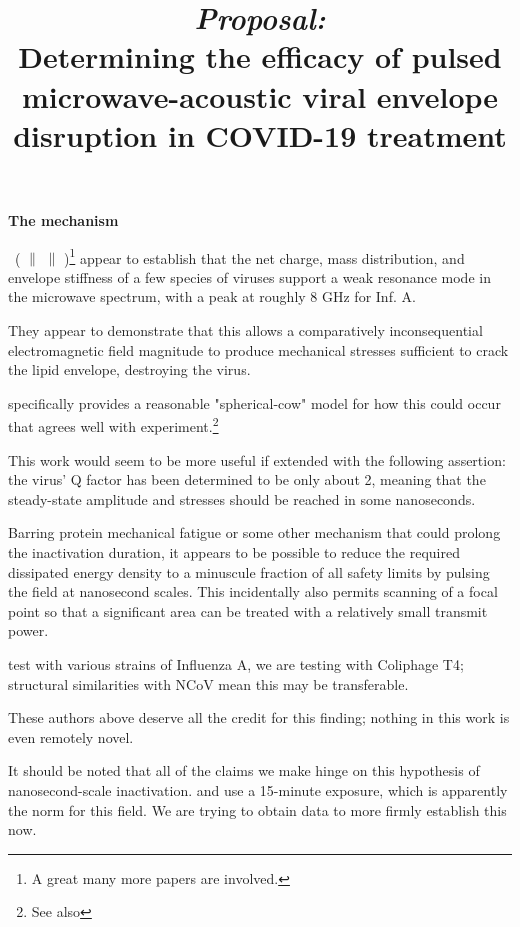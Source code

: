 \documentclass[fleqn,10pt]{paper}
\title{ {\it Proposal:}\\ Determining the efficacy of pulsed microwave-acoustic viral envelope disruption in COVID-19 treatment}
\begin{document}
\maketitle



{\Large \textbf{The mechanism}}


\cite{Microwave2009} \textrightarrow \ (\cite{focusing2014} $\parallel$ \cite{Efficient2015} $\parallel$ \cite{Resonant2017})\footnote{A great many more papers are involved.} appear to establish that the net charge, mass distribution, and envelope stiffness of a few species of viruses support a weak resonance mode in the microwave spectrum, with a peak at roughly 8 GHz for Inf. A.

They appear to demonstrate that this allows a comparatively inconsequential electromagnetic field magnitude to produce mechanical stresses sufficient to crack the lipid envelope, destroying the virus.

\cite{Efficient2015} specifically provides a reasonable "spherical-cow" model for how this could occur that agrees well with experiment.\footnote{See also }

This work would seem to be more useful if extended with the following assertion: the virus' Q factor has been determined to be only about 2, meaning that the steady-state amplitude and stresses should be reached in some nanoseconds.

Barring protein mechanical fatigue\cite{Mechanical2013} or some other mechanism that could prolong the inactivation duration, it appears to be possible to reduce the required dissipated energy density to a minuscule fraction of all safety limits by pulsing the field at nanosecond scales. This incidentally also permits scanning of a focal point so that a significant area can be treated with a relatively small transmit power.

\cite{Efficient2015} test with various strains of Influenza A, we are testing with Coliphage T4; structural similarities with NCoV mean this may be transferable. 

These authors above deserve all the credit for this finding; nothing in this work is even remotely novel.

\begin{autem}
	It should be noted that all of the claims we make hinge on this hypothesis of nanosecond-scale inactivation. \cite{Efficient2015} and \cite{focusing2014} use a 15-minute exposure, which is apparently the norm for this field. We are trying to obtain data to more firmly establish this now.
\end{autem}
\end{document}
